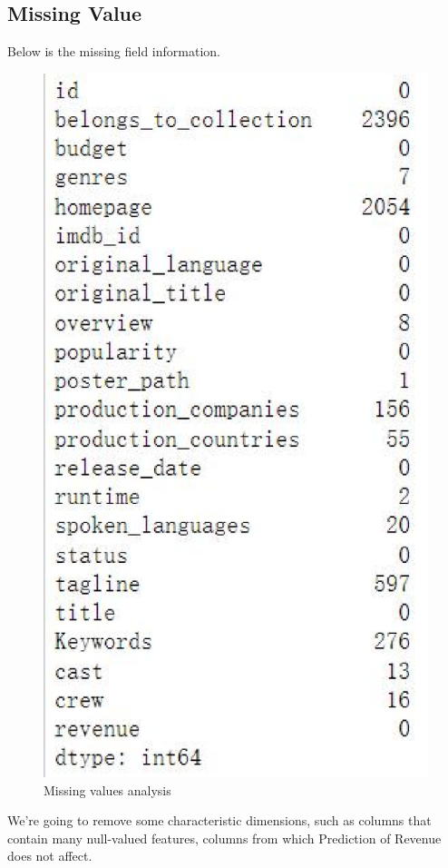 \subsection{Missing Value} 
Below is the missing field information. \\
\begin{figure}[htbp]
  \includegraphics[scale=0.4]{./figures/MissingValue.eps}
  \caption{Missing values analysis}
\end{figure}
We're going to remove some characteristic dimensions,
such as columns that contain many null-valued features,
columns from which Prediction of Revenue does not affect.



